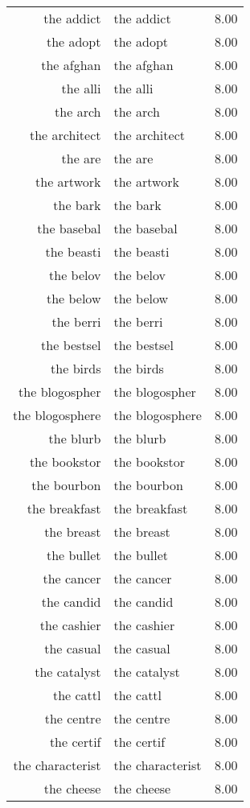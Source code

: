\begin{table}[ht]
\begin{tabular}{rlr}
  the addict & the addict & 8.00 \\ 
  the adopt & the adopt & 8.00 \\ 
  the afghan & the afghan & 8.00 \\ 
  the alli & the alli & 8.00 \\ 
  the arch & the arch & 8.00 \\ 
  the architect & the architect & 8.00 \\ 
  the are & the are & 8.00 \\ 
  the artwork & the artwork & 8.00 \\ 
  the bark & the bark & 8.00 \\ 
  the basebal & the basebal & 8.00 \\ 
  the beasti & the beasti & 8.00 \\ 
  the belov & the belov & 8.00 \\ 
  the below & the below & 8.00 \\ 
  the berri & the berri & 8.00 \\ 
  the bestsel & the bestsel & 8.00 \\ 
  the birds & the birds & 8.00 \\ 
  the blogospher & the blogospher & 8.00 \\ 
  the blogosphere & the blogosphere & 8.00 \\ 
  the blurb & the blurb & 8.00 \\ 
  the bookstor & the bookstor & 8.00 \\ 
  the bourbon & the bourbon & 8.00 \\ 
  the breakfast & the breakfast & 8.00 \\ 
  the breast & the breast & 8.00 \\ 
  the bullet & the bullet & 8.00 \\ 
  the cancer & the cancer & 8.00 \\ 
  the candid & the candid & 8.00 \\ 
  the cashier & the cashier & 8.00 \\ 
  the casual & the casual & 8.00 \\ 
  the catalyst & the catalyst & 8.00 \\ 
  the cattl & the cattl & 8.00 \\ 
  the centre & the centre & 8.00 \\ 
  the certif & the certif & 8.00 \\ 
  the characterist & the characterist & 8.00 \\ 
  the cheese & the cheese & 8.00 \\ 

\end{tabular}
\end{table}
